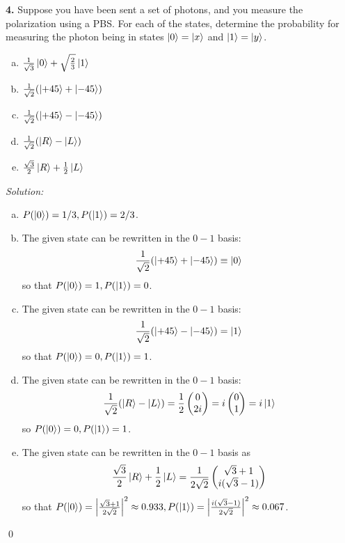 \documentclass{book}
\theoremstyle{definition}
\newcommand{\f}[2]{\frac{#1}{#2}}
\begin{document}
\newpage



\noindent \textbf{4.} Suppose you have been sent a set of photons, and you measure the polarization using a PBS. For each of the states, determine the probability for measuring the photon being in states $\ket{0} = \ket{x}$ and $\ket{1} = \ket{y}$. 
\begin{enumerate}[(a)]
	\item $\f{1}{\sqrt{3}}\ket{0} + \sqrt{\f{2}{3}}\ket{1}$
	\item $\f{1}{\sqrt{2}}(\ket{+45} + \ket{-45} ) $
	\item $\f{1}{\sqrt{2}}(\ket{+45} - \ket{-45}) $
	\item $\f{1}{\sqrt{2}}(\ket{R} - \ket{L})$
	\item $\f{\sqrt{3}}{2}\ket{R} + \f{1}{2}\ket{L}$
\end{enumerate}


\noindent \textit{Solution:} 
\begin{enumerate}[(a)]
	\item $P(\ket{0}) = 1/3, P(\ket{1}) = {2/3}$.
	\item The given state can be rewritten in the $0-1$ basis:
	\begin{align}
	\f{1}{\sqrt{2}}(\ket{+45} + \ket{-45} ) \equiv \ket{0}
	\end{align}
	so that $P(\ket{0}) = 1, P(\ket{1}) = 0$.
	\item The given state can be rewritten in the $0-1$ basis:
	\begin{align}
	\f{1}{\sqrt{2}}(\ket{+45} - \ket{-45}) = \ket{1}
	\end{align}
	so that $P(\ket{0}) = 0, P(\ket{1}) = 1$.
	\item The given state can be rewritten in the $0-1$ basis:
	\begin{align}
	\f{1}{\sqrt{2}}(\ket{R} - \ket{L}) = \f{1}{2}\begin{pmatrix}
	0 \\ 2i
	\end{pmatrix} = i\begin{pmatrix}
	0\\1
	\end{pmatrix} = i\ket{1}
	\end{align}
	so $P(\ket{0}) = 0, P(\ket{1}) = 1$.
	\item The given state can be rewritten in the $0-1$ basis as
	\begin{align}
	\f{\sqrt{3}}{2}\ket{R} + \f{1}{2}\ket{L} = \f{1}{2\sqrt{2}}\begin{pmatrix}
	\sqrt{3}+1 \\ i(\sqrt{3}-1)
	\end{pmatrix}
	\end{align}
	so that $P(\ket{0}) = \abs{\f{\sqrt{3}+1}{2\sqrt{2}}}^2 \approx 0.933, P(\ket{1}) = \abs{\f{i(\sqrt{3}-1)}{2\sqrt{2}}}^2 \approx 0.067$.
\end{enumerate}\qed
\end{document}
